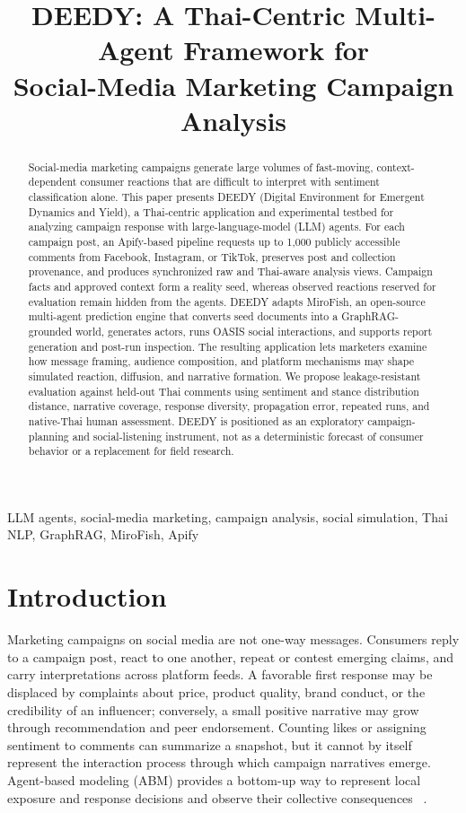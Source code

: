 \documentclass[conference]{IEEEtran}
\title{DEEDY: A Thai-Centric Multi-Agent Framework for\\
Social-Media Marketing Campaign Analysis}
\author{\IEEEauthorblockN{Sawit Koseeyaumporn}
\IEEEauthorblockA{Department of Computer Engineering\\
King Mongkut's University of Technology Thonburi, Bangkok, Thailand\\
\texttt{sawit.kosee@kmutt.ac.th}}}
\begin{document}
\maketitle

\begin{abstract}
Social-media marketing campaigns generate large volumes of fast-moving,
context-dependent consumer reactions that are difficult to interpret with
sentiment classification alone. This paper presents DEEDY (Digital Environment
for Emergent Dynamics and Yield), a Thai-centric application and experimental
testbed for analyzing campaign response with large-language-model (LLM)
agents. For each campaign post, an Apify-based pipeline requests up to 1,000
publicly accessible comments from Facebook, Instagram, or TikTok, preserves
post and collection provenance, and produces synchronized raw and Thai-aware
analysis views. Campaign facts and approved context form a reality seed,
whereas observed reactions reserved for evaluation remain hidden from the
agents. DEEDY adapts MiroFish, an open-source multi-agent prediction engine
that converts seed documents into a GraphRAG-grounded world, generates actors,
runs OASIS social interactions, and supports report generation and post-run
inspection. The resulting application lets marketers examine how message
framing, audience composition, and platform mechanisms may shape simulated
reaction, diffusion, and narrative formation. We propose leakage-resistant
evaluation against held-out Thai comments using sentiment and stance
distribution distance, narrative coverage, response diversity, propagation
error, repeated runs, and native-Thai human assessment. DEEDY is positioned as
an exploratory campaign-planning and social-listening instrument, not as a
deterministic forecast of consumer behavior or a replacement for field
research.
\end{abstract}

\begin{IEEEkeywords}
LLM agents, social-media marketing, campaign analysis, social simulation, Thai
NLP, GraphRAG, MiroFish, Apify
\end{IEEEkeywords}

\section{Introduction}

Marketing campaigns on social media are not one-way messages. Consumers reply
to a campaign post, react to one another, repeat or contest emerging claims,
and carry interpretations across platform feeds. A favorable first response
may be displaced by complaints about price, product quality, brand conduct, or
the credibility of an influencer; conversely, a small positive narrative may
grow through recommendation and peer endorsement. Counting likes or assigning
sentiment to comments can summarize a snapshot, but it cannot by itself
represent the interaction process through which campaign narratives emerge.
Agent-based modeling (ABM) provides a bottom-up way to represent local exposure
and response decisions and observe their collective consequences
~\cite{macal2010tutorial}.
\end{document}
